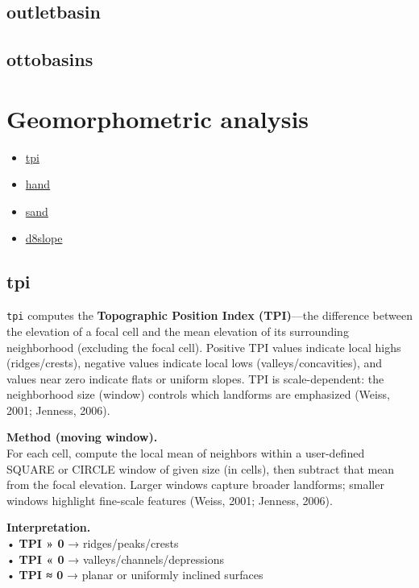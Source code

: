 \documentclass[
]{book}
\providecommand{\tightlist}{%
  \setlength{\itemsep}{0pt}\setlength{\parskip}{0pt}}
\begin{document}
\subsection{outletbasin}\label{outletbasin}

\subsection{ottobasins}\label{ottobasins}

\section{Geomorphometric analysis}\label{Geomorphometric-analysis}

\begin{itemize}
\tightlist
\item
  \hyperref[tpi]{tpi}\\
\item
  \hyperref[hand]{hand}\\
\item
  \hyperref[sand]{sand}\\
\item
  \hyperref[d8slope]{d8slope}
\end{itemize}

\subsection{tpi}\label{tpi}

\texttt{tpi} computes the \textbf{Topographic Position Index (TPI)}---the difference between the elevation of a focal cell and the mean elevation of its surrounding neighborhood (excluding the focal cell). Positive TPI values indicate local highs (ridges/crests), negative values indicate local lows (valleys/concavities), and values near zero indicate flats or uniform slopes. TPI is scale-dependent: the neighborhood size (window) controls which landforms are emphasized (Weiss, 2001; Jenness, 2006).

\textbf{Method (moving window).}\\
For each cell, compute the local mean of neighbors within a user-defined SQUARE or CIRCLE window of given size (in cells), then subtract that mean from the focal elevation. Larger windows capture broader landforms; smaller windows highlight fine-scale features (Weiss, 2001; Jenness, 2006).

\textbf{Interpretation.}\\
• \textbf{TPI » 0} → ridges/peaks/crests\\
• \textbf{TPI « 0} → valleys/channels/depressions\\
• \textbf{TPI ≈ 0} → planar or uniformly inclined surfaces
\end{document}
